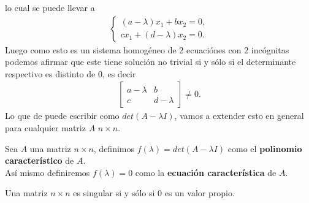 lo cual se puede llevar a
\begin{align*}
  \begin{cases}
    (a-\lambda)x_1+bx_2=0, \\
    cx_1+(d-\lambda)x_2=0.
  \end{cases}
\end{align*}
Luego como esto es un sistema homogéneo de 2 ecuaciónes con 2 incógnitas podemos afirmar que este tiene solución no trivial si y sólo si el determinante respectivo es distinto de $0$, es decir
\begin{align*}
  \begin{bmatrix}
    a-\lambda & b \\
    c & d-\lambda
  \end{bmatrix}\neq 0.
\end{align*}
Lo que de puede escribir como $det(A-\lambda I)$, vamos a extender esto en general para cualquier matriz $A$ $n\times n$.
\begin{definition}
  Sea $A$ una matriz $n\times n$, definimos $f(\lambda)=det(A-\lambda I)$ como el \textbf{polinomio característico} de $A$.\\
  Así mismo definiremos $f(\lambda)=0$ como la \textbf{ecuación característica} de $A$. 
\end{definition}
\begin{theorem}
  Una matriz $n\times n$ es singular si y sólo si $0$ es un valor propio. 
\end{theorem}
